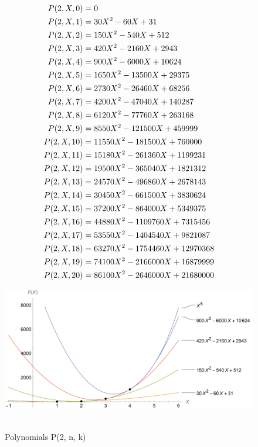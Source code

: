 ﻿\begin{align*}
    {P}(2,X,0) &= 0 \\
    {P}(2,X,1) &= 30X^2 - 60X + 31 \\
    {P}(2,X,2) &= 150X^2 - 540X + 512 \\
    {P}(2,X,3) &= 420X^2 - 2160X + 2943 \\
    {P}(2,X,4) &= 900X^2 - 6000X + 10624 \\
    {P}(2,X,5) &= 1650X^2 - 13500X + 29375 \\
    {P}(2,X,6) &= 2730X^2 - 26460X + 68256 \\
    {P}(2,X,7) &= 4200X^2 - 47040X + 140287 \\
    {P}(2,X,8) &= 6120X^2 - 77760X + 263168 \\
    {P}(2,X,9) &= 8550X^2 - 121500X + 459999 \\
    {P}(2,X,10) &= 11550X^2 - 181500X + 760000 \\
    {P}(2,X,11) &= 15180X^2 - 261360X + 1199231 \\
    {P}(2,X,12) &= 19500X^2 - 365040X + 1821312 \\
    {P}(2,X,13) &= 24570X^2 - 496860X + 2678143 \\
    {P}(2,X,14) &= 30450X^2 - 661500X + 3830624 \\
    {P}(2,X,15) &= 37200X^2 - 864000X + 5349375 \\
    {P}(2,X,16) &= 44880X^2 - 1109760X + 7315456 \\
    {P}(2,X,17) &= 53550X^2 - 1404540X + 9821087 \\
    {P}(2,X,18) &= 63270X^2 - 1754460X + 12970368 \\
    {P}(2,X,19) &= 74100X^2 - 2166000X + 16879999 \\
    {P}(2,X,20) &= 86100X^2 - 2646000X + 21680000
\end{align*}
\begin{figure}[H]
    \centering
    \includegraphics[width=1\textwidth]{sections/images/03_plots_fifth_with_p2}
    ~\caption{Polynomials P(2, n, k)}\label{fig:figure3}
\end{figure}
